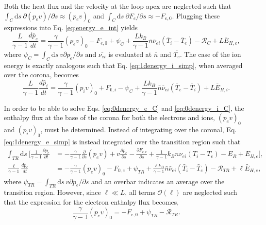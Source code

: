 Both the heat flux and the velocity at the loop apex are neglected such that $\int_C\mathrm{d}s~\partial (p_ev)/\partial s\approx (p_ev)_0$ and $\int_C\mathrm{d}s~\partial F_{e}/\partial s\approx -F_{e,0}$. Plugging these expressions into Eq. \ref{eq:energy_e_int} yields
\begin{equation}
	\label{eq:0denergy_e_C}
	\frac{L}{\gamma - 1}\frac{d \bar{p}_e}{dt} = \frac{\gamma}{\gamma - 1}(p_ev)_0 + F_{e,0} + \psi_C + \frac{Lk_B}{\gamma - 1}\bar{n}\bar{\nu}_{ei}(\bar{T}_i - \bar{T}_e) - \mathcal{R}_C + L\bar{E}_{H,e},
\end{equation}
where $\psi_C=\int_C\mathrm{d}s~v\partial p_e/\partial s$ and $\bar{\nu_{ei}}$ is evaluated at $\bar{n}$ and $\bar{T_e}$. The case of the ion energy is exactly analogous such that Eq. \ref{eq:1denergy_i_simp}, when averaged over the corona, becomes
\begin{equation}
	\label{eq:0denergy_i_C}
	\frac{L}{\gamma - 1}\frac{d \bar{p}_i}{dt} = \frac{\gamma}{\gamma - 1}(p_iv)_0 + F_{0,i} - \psi_C + \frac{Lk_B}{\gamma - 1}\bar{n}\bar{\nu}_{ei}(\bar{T}_e - \bar{T}_i) + L\bar{E}_{H,i}.
\end{equation}
%
\par In order to be able to solve Eqs. \ref{eq:0denergy_e_C} and \ref{eq:0denergy_i_C}, the enthalpy flux at the base of the corona for both the electrons and ions, $(p_ev)_0$ and $(p_iv)_0$, must be determined. Instead of integrating over the coronal, Eq. \ref{eq:1denergy_e_simp} is instead integrated over the transition region such that 
\begin{align}
	\int_{TR}\mathrm{d}s~\Big[\frac{1}{\gamma - 1}\frac{\partial p_e}{\partial t} &= -\frac{\gamma}{\gamma - 1}\frac{\partial}{\partial s}(p_ev)+v\frac{\partial p_e}{\partial s} - \frac{\partial F_{c,e}}{\partial s} + \frac{1}{\gamma - 1}k_Bn\nu_{ei}(T_i-T_e) -E_R+E_{H,e}\Big], \\[0.5em]
	\frac{\ell}{\gamma - 1}\frac{d \bar{p}_e}{dt} &= -\frac{\gamma}{\gamma - 1}(p_ev)_0 - F_{0,e} + \psi_{TR} + \frac{\ell k_B}{\gamma - 1}\bar{n}\bar{\nu}_{ei}(\bar{T}_i - \bar{T}_e) - \mathcal{R}_{TR} + \ell\bar{E}_{H,e},
\end{align}
where $\psi_{TR}=\int_{TR}\mathrm{d}s~v\partial p_e/\partial s$ and an overbar indicates an average over the transition region. However, since $\ell\ll L$, all terms $\mathcal{O}(\ell)$ are neglected such that the expression for the electron enthalpy flux becomes,
\begin{equation}
	\label{eq:enthalpy_flux_e}
	\frac{\gamma}{\gamma - 1}(p_ev)_0 = - F_{e,0} + \psi_{TR} - \mathcal{R}_{TR}.
\end{equation}

